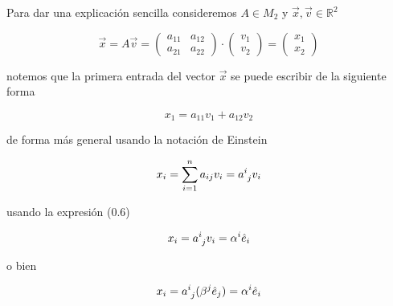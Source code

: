 \documentclass[12pt]{article}
\numberwithin{equation}{section}
\begin{document}
Para dar una explicación sencilla consideremos $A\in M_2$ y $\vec{x}, \vec{v}\in  \mathds{R}^2$ 

\begin{equation}
\vec{x}= A\vec{v}= 
\left(
\begin{array}{ccc}
     a_{11} & a_{12}
  \\a_{21}& a_{22} 
  
\end{array}
\right)  \cdot   \left(
\begin{array}{ccc}
     v_{1} 
  \\v_{2}
  
\end{array}
\right)=\left(
\begin{array}{ccc}
     x_{1} 
  \\x_{2}
  
\end{array}
\right)
\end{equation}

notemos que la primera entrada del vector $\vec{x}$ se puede escribir de la siguiente forma


\begin{equation}
x_1= a_{11}v_1+a_{12}v_2
\end{equation}

de forma más general usando la notación de Einstein


\begin{equation}
x_i= \sum_{i=1}^n a_{ij}v_i=a\indices{^i_j} v_i
\end{equation}

usando la expresión (0.6)


\begin{equation}
x_i= a\indices{^i_j} v_i= \alpha^i \hat{e}_i
\end{equation}

o bien 

\begin{equation}
x_i= a\indices{^i_j} (\beta^j \hat{e}_j)= \alpha^i \hat{e}_i
\end{equation}
\end{document}
